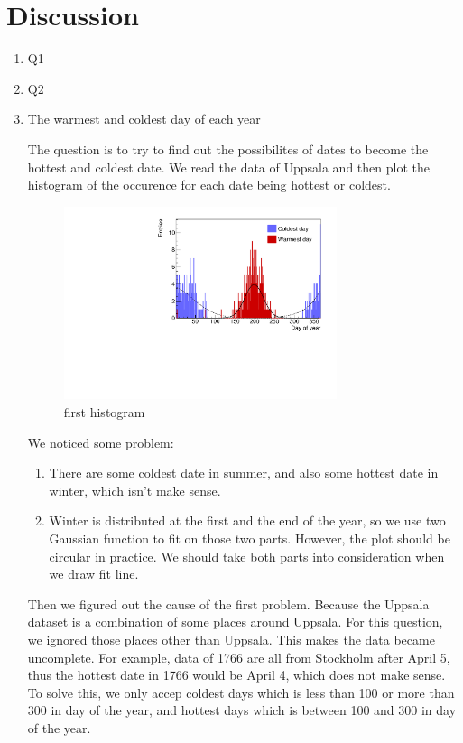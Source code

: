 \documentclass[a4paper]{article}
\begin{document}
\section{Discussion}
\begin{enumerate}

\item Q1
\item Q2
\item The warmest and coldest day of each year

The question is to try to find out the possibilites of dates to become the hottest and coldest date. We read the data of Uppsala and then plot the histogram of the occurence for each date being hottest or coldest. 

\begin{figure}[htp]
    \centering
    \includegraphics[width=8cm]{./images/hotCold_Upp_prev}
    \caption{first histogram}
    \label{fig:hist}
\end{figure}

We noticed some problem:
\begin{enumerate}
\item There are some coldest date in summer, and also some hottest date in winter, which isn't make sense.
\item Winter is distributed at the first and the end of the year, so we use two Gaussian function to fit on those two parts. However, the plot should be circular in practice. We should take both parts into consideration when we draw fit line.
\end{enumerate}
Then we figured out the cause of the first problem. Because the Uppsala dataset is a combination of some places around Uppsala. For this question, we ignored those places other than Uppsala. This makes the data became uncomplete. For example, data of 1766 are all from Stockholm after April 5, thus the hottest date in 1766 would be April 4, which does not make sense. To solve this, we only accep coldest days which is less than 100 or more than 300 in day of the year, and hottest days which is between 100 and 300 in day of the year.





\end{enumerate}
\end{document}
